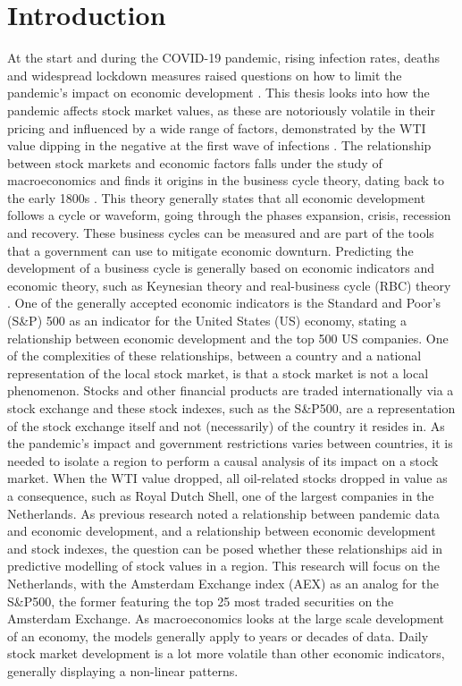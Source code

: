\section{Introduction}
\label{sec:intro}
At the start and during the COVID-19 pandemic, rising infection rates, deaths and widespread lockdown measures raised questions on how to limit the pandemic's impact on economic development \cite{velavan2020covid}. This thesis looks into how the pandemic affects stock market values, as these are notoriously volatile in their pricing and influenced by a wide range of factors, demonstrated by the WTI value dipping in the negative at the first wave of infections \cite{CORBET2020104978}. 
The relationship between stock markets and economic factors falls under the study of macroeconomics and finds it origins in the business cycle theory, dating back to the early 1800s \cite{de1827nouveaux}. This theory generally states that all economic development follows a cycle or waveform, going through the phases expansion, crisis, recession and recovery. These business cycles can be measured \cite{baxter1999measuring} and are part of the tools that a government can use to mitigate economic downturn. Predicting the development of a business cycle is generally based on economic indicators and economic theory, such as Keynesian theory  \cite{keynes2018general} and real-business cycle (RBC) theory \cite{kydland1982time}. One of the generally accepted economic indicators is the Standard and Poor's (S\&P) 500 as an indicator for the United States (US) economy, stating a relationship between economic development and the top 500 US companies. %
One of the complexities of these relationships, between a country and a national representation of the local stock market, is that a stock market is not a local phenomenon. Stocks and other financial products are traded internationally via a stock exchange and these stock indexes, such as the S\&P500, are a representation of the stock exchange itself and not (necessarily) of the country it resides in. As the pandemic's impact and government restrictions varies between countries, it is needed to isolate a region to perform a causal analysis of its impact on a stock market.
When the WTI value dropped, all oil-related stocks dropped in value as a consequence, such as Royal Dutch Shell, one of the largest companies in the Netherlands. As previous research noted a relationship between pandemic data and economic development, and a relationship between economic development and stock indexes, the question can be posed whether these relationships aid in predictive modelling of stock values in a region. This research will focus on the Netherlands, with the Amsterdam Exchange index (AEX) as an analog for the S\&P500, the former featuring the top 25 most traded securities on the Amsterdam Exchange. As macroeconomics looks at the large scale development of an economy, the models generally apply to years or decades of data. Daily stock market development is a lot more volatile than other economic indicators, generally displaying a non-linear patterns. 
